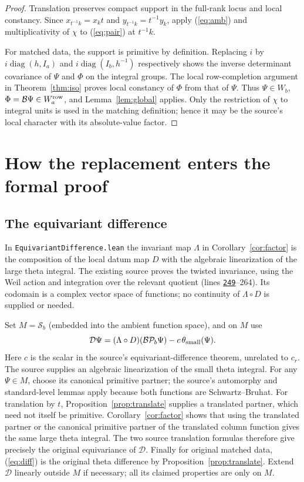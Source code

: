 \documentclass[11pt]{article}
\theoremstyle{remark}\newtheorem{remark}[theorem]{Remark}
\newcommand{\SB}{\mathcal S}
\newcommand{\Prj}{\mathcal P}
\newcommand{\Match}{\mathcal B}
\newcommand{\src}[2]{\href{https://github.com/VladimirReshetnikov/ProveIt/blob/ee10f937fedac0955d28b7b860f4c44fab508204/Analysis/GeneralizedRiemannHypothesis/Lean/grh/src/#1\#L#2}{\texttt{#2}}}
\begin{document}
\begin{proof}
Translation preserves compact support in the full-rank locus and local constancy. Since $x_{t^{-1}k}=x_k t$ and $y_{t^{-1}k}=t^{-1}y_k$, apply (\ref{eq:amb}) and multiplicativity of $\chi$ to (\ref{eq:pair}) at $t^{-1}k$.

For matched data, the support is primitive by definition. Replacing $i$ by $i\operatorname{diag}(h,I_a)$ and $i\operatorname{diag}(I_b,h^{-1})$ respectively shows the inverse determinant covariance of $\Psi$ and $\Phi$ on the integral groups. The local row-completion argument in Theorem~\ref{thm:iso} proves local constancy of $\Phi$ from that of $\Psi$. Thus $\Psi\in W_b$, $\Phi=\Match\Psi\in W_a^{\rm row}$, and Lemma~\ref{lem:global} applies. Only the restriction of $\chi$ to integral units is used in the matching definition; hence it may be the source's local character with its absolute-value factor.
\end{proof}

\section{How the replacement enters the formal proof}
\subsection{The equivariant difference}
In \texttt{EquivariantDifference.lean} the invariant map $\Lambda$ in Corollary~\ref{cor:factor} is the composition of the local datum map $D$ with the algebraic linearization of the large theta integral. The existing source proves the twisted invariance, using the Weil action and integration over the relevant quotient (lines \src{New/Determinant/Exchange/EquivariantDifference.lean}{249}--264). Its codomain is a complex vector space of functions; no continuity of $\Lambda\circ D$ is supplied or needed.

Set $M=\SB_b$ (embedded into the ambient function space), and on $M$ use
\begin{equation}\label{eq:diff}
 \mathcal D\Psi=(\Lambda\circ D)(\Match\Prj_b\Psi)-c\,\theta_{\rm small}(\Psi).
\end{equation}
Here $c$ is the scalar in the source's equivariant-difference theorem, unrelated to $c_r$. The source supplies an algebraic linearization of the small theta integral. For any $\Psi\in M$, choose its canonical primitive partner; the source's automorphy and standard-level lemmas apply because both functions are Schwartz--Bruhat. For translation by $t$, Proposition~\ref{prop:translate} supplies a translated partner, which need not itself be primitive. Corollary~\ref{cor:factor} shows that using the translated partner or the canonical primitive partner of the translated column function gives the same large theta integral. The two source translation formulas therefore give precisely the original equivariance of $\mathcal D$. Finally for original matched data, (\ref{eq:diff}) is the original theta difference by Proposition~\ref{prop:translate}. Extend $\mathcal D$ linearly outside $M$ if necessary; all its claimed properties are only on $M$.
\end{document}
